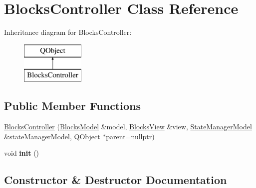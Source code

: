 \hypertarget{class_blocks_controller}{}\section{Blocks\+Controller Class Reference}
\label{class_blocks_controller}
Inheritance diagram for Blocks\+Controller\+:\begin{figure}[H]
\begin{center}
\leavevmode
\includegraphics[height=2.000000cm]{class_blocks_controller}
\end{center}
\end{figure}
\subsection*{Public Member Functions}
\begin{DoxyCompactItemize}
\item 
\mbox{\hyperlink{class_blocks_controller_a477c727edcc0d3fd121beae431d7539b}{Blocks\+Controller}} (\mbox{\hyperlink{class_blocks_model}{Blocks\+Model}} \&model, \mbox{\hyperlink{class_blocks_view}{Blocks\+View}} \&view, \mbox{\hyperlink{class_state_manager_model}{State\+Manager\+Model}} \&state\+Manager\+Model, Q\+Object $\ast$parent=nullptr)
\item 
\mbox{\label{class_blocks_controller_a469ef02a49634593039a88e96dcff22c}} 
void {\bfseries init} ()
\end{DoxyCompactItemize}


\subsection{Constructor \& Destructor Documentation}
\mbox{\label{class_blocks_controller_a477c727edcc0d3fd121beae431d7539b}} 
